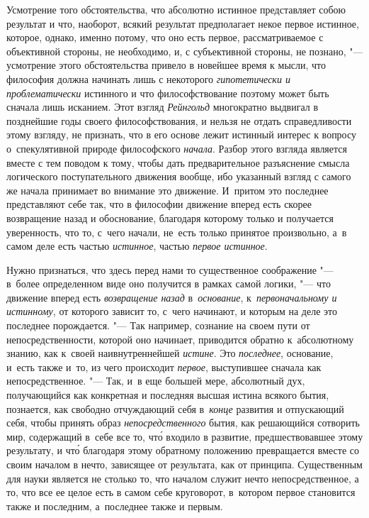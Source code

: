 Усмотрение того обстоятельства, что абсолютно истинное представляет собою
результат и что, наоборот, всякий результат предполагает некое первое истинное,
которое, однако, именно потому, что оно есть первое, рассматриваемое с
объективной стороны, не необходимо, и, с субъективной стороны, не познано, "---
усмотрение этого обстоятельства привело в новейшее время к мысли, что философия
должна начинать лишь с некоторого {\em гипотетически и проблематически}
истинного и что философствование поэтому может быть сначала лишь исканием. Этот
взгляд {\em Рейнгольд} многократно выдвигал в позднейшие годы своего
философствования, и нельзя не отдать справедливости этому взгляду, не признать,
что в его основе лежит истинный интерес к вопросу о~спекулятивной природе
философского {\em начала}. Разбор этого взгляда является вместе с тем поводом к
тому, чтобы дать предварительное разъяснение смысла логического поступательного
движения вообще, ибо указанный взгляд с самого же начала принимает во внимание
это движение. И~притом это последнее представляют себе так, что в философии
движение вперед есть скорее возвращение назад и обоснование, благодаря которому
только и получается уверенность, что то, с~чего начали, не~есть только принятое
произвольно, а~в самом деле есть частью {\em истинное}, частью
{\em первое истинное}.

Нужно признаться, что здесь перед нами то существенное соображение "--- в~более
определенном виде оно получится в рамках самой логики, "--- что движение вперед
есть {\em возвращение назад} в~{\em основание}, к~{\em первоначальному и
истинному}, от которого зависит то, с~чего начинают, и которым на деле это
последнее порождается. "--- Так например, сознание на своем пути от
непосредственности, которой оно начинает, приводится обратно к~абсолютному
знанию, как к~своей наивнутреннейшей {\em истине}. Это {\em последнее},
основание, и~есть также и~то, из чего происходит {\em первое}, выступившее
сначала как непосредственное. "--- Так, и~в еще большей мере, абсолютный дух,
получающийся как конкретная и последняя высшая истина всякого бытия, познается,
как свободно отчуждающий себя в~{\em конце} развития и отпускающий себя, чтобы
принять образ {\em непосредственного} бытия, как решающийся сотворить мир,
содержащий в~себе все то, чт\'{о} входило в развитие, предшествовавшее этому
результату, и чт\'{о} благодаря этому обратному положению превращается вместе
со своим началом в нечто, зависящее от результата, как от принципа.
Существенным для науки является не столько то, что началом служит нечто
непосредственное, а то, что все ее целое есть в самом себе круговорот,
в~котором первое становится также и последним, а~последнее также и первым.

